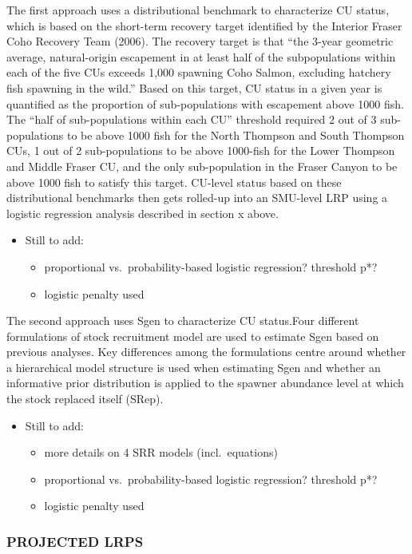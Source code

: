 \documentclass[11pt]{book}
\begin{document}
The first approach uses a distributional benchmark to characterize CU status, which is based on the short-term recovery target identified by the Interior Fraser Coho Recovery Team (2006). The recovery target is that ``the 3-year geometric average, natural-origin escapement in at least half of the subpopulations within each of the five CUs exceeds 1,000 spawning Coho Salmon, excluding hatchery fish spawning in the wild.'' Based on this target, CU status in a given year is quantified as the proportion of sub-populations with escapement above 1000 fish. The ``half of sub-populations within each CU'' threshold required 2 out of 3 sub-populations to be above 1000 fish for the North Thompson and South Thompson CUs, 1 out of 2 sub-populations to be above 1000-fish for the Lower Thompson and Middle Fraser CU, and the only sub-population in the Fraser Canyon to be above 1000 fish to satisfy this target. CU-level status based on these distributional benchmarks then gets rolled-up into an SMU-level LRP using a logistic regression analysis described in section x above.
\begin{itemize}

\item
  Still to add:
  \begin{itemize}

  \item
    proportional vs.~probability-based logistic regression? threshold p*?
  \item
    logistic penalty used
  \end{itemize}
\end{itemize}
The second approach uses Sgen to characterize CU status.Four different formulations of stock recruitment model are used to estimate Sgen based on previous analyses. Key differences among the formulations centre around whether a hierarchical model structure is used when estimating Sgen and whether an informative prior distribution is applied to the spawner abundance level at which the stock replaced itself (SRep).
\begin{itemize}

\item
  Still to add:
  \begin{itemize}

  \item
    more details on 4 SRR models (incl.~equations)
  \item
    proportional vs.~probability-based logistic regression? threshold p*?
  \item
    logistic penalty used
  \end{itemize}
\end{itemize}
\hypertarget{projected-lrps}{%
\subsubsection{PROJECTED LRPS}\label{projected-lrps}}
\end{document}
